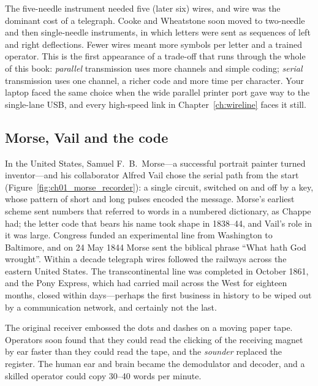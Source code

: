 The five-needle instrument needed five (later six) wires, and wire was the dominant cost of a
telegraph. Cooke and Wheatstone soon moved to two-needle and then single-needle instruments, in
which letters were sent as sequences of left and right deflections. Fewer wires meant more symbols
per letter and a trained operator. This is the first appearance of a trade-off that runs through the
whole of this book: \emph{parallel} transmission uses more channels and simple coding; \emph{serial}
transmission uses one channel, a richer code and more time per character. Your laptop faced the same
choice when the wide parallel printer port gave way to the single-lane USB, and every high-speed
link in Chapter~\ref{ch:wireline} faces it still.

\subsection{Morse, Vail and the code}
\label{sec:ch01:morse}

In the United States, Samuel F.~B.~Morse---a successful portrait painter turned inventor---and his
collaborator Alfred Vail chose the serial path from the start
(Figure~\ref{fig:ch01_morse_recorder}): a single circuit, switched on and off by a key, whose pattern
of short and long pulses encoded the message. Morse's earliest scheme sent numbers that referred to
words in a numbered dictionary, as Chappe had; the letter code that bears his name took shape in
1838--44, and Vail's role in it was large. Congress funded an experimental line from Washington to
Baltimore, and on 24 May 1844 Morse sent the biblical phrase ``What hath God wrought''. Within a
decade telegraph wires followed the railways across the eastern United States. The transcontinental
line was completed in October 1861, and the Pony Express, which had carried mail across the West for
eighteen months, closed within days---perhaps the first business in history to be wiped out by a
communication network, and certainly not the last.

The original receiver embossed the dots and dashes on a moving paper tape. Operators soon found
that they could read the clicking of the receiving magnet by ear faster than they could read the
tape, and the \emph{sounder} replaced the register. The human ear and brain became the demodulator
and decoder, and a skilled operator could copy 30--40 words per minute.

